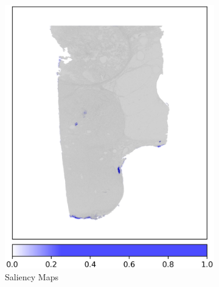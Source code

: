 \begin{figure}[h!t]
\begin{subfigure}[b]{0.49\textwidth}
         \includegraphics[width=\textwidth]{latex/captum/case111/saliency_case111-stain1-censored_3499days.png}
         \caption{Saliency Maps}
     \end{subfigure}
    \hfill
     \begin{subfigure}[b]{0.49\textwidth}
         \centering

\end{subfigure}
\end{figure}
